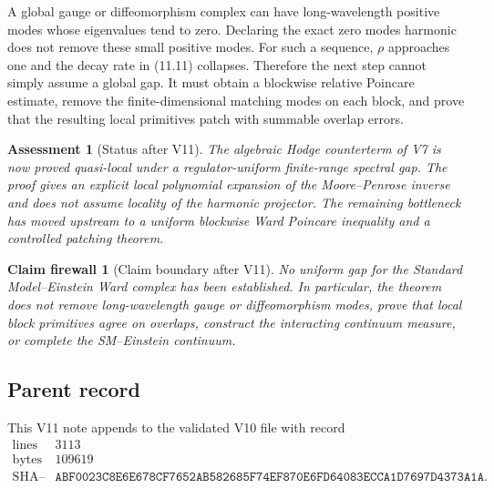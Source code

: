 \documentclass[11pt]{article}
\newtheorem{firewall}[theorem]{Claim firewall}
\newtheorem{assessment}[theorem]{Assessment}
\theoremstyle{remark}
\begin{document}
A global gauge or diffeomorphism complex can have long-wavelength
positive modes whose eigenvalues tend to zero.  Declaring the exact
zero modes harmonic does not remove these small positive modes.
For such a sequence, \(\rho\) approaches one and the decay rate in
(11.11) collapses.  Therefore the next step cannot simply assume a
global gap.  It must obtain a blockwise relative Poincare estimate,
remove the finite-dimensional matching modes on each block, and
prove that the resulting local primitives patch with summable
overlap errors.

\begin{assessment}[Status after V11]
\label{ass:v12v11-status}
The algebraic Hodge counterterm of V7 is now proved quasi-local under
a regulator-uniform finite-range spectral gap.  The proof gives an
explicit local polynomial expansion of the Moore--Penrose inverse
and does not assume locality of the harmonic projector.  The
remaining bottleneck has moved upstream to a uniform blockwise Ward
Poincare inequality and a controlled patching theorem.
\end{assessment}

\begin{firewall}[Claim boundary after V11]
\label{fire:v12v11-claim}
No uniform gap for the Standard Model--Einstein Ward complex has
been established.  In particular, the theorem does not remove
long-wavelength gauge or diffeomorphism modes, prove that local block
primitives agree on overlaps, construct the interacting continuum
measure, or complete the SM--Einstein continuum.
\end{firewall}

\subsection{Parent record}

This V11 note appends to the validated V10 file with record
\[
\begin{array}{c|c}
\text{lines}&3113\\
\text{bytes}&109619\\
\text{SHA--256}&
\texttt{ABF0023C8E6E678CF7652AB582685F74EF870E6FD64083ECCA1D7697D4373A1A}.
\end{array}
\]

\end{document}
